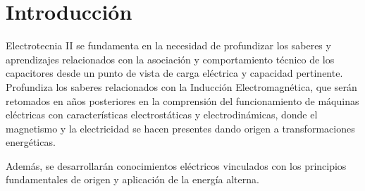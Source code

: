 \documentclass[../main]{subfiles}
\begin{document}
\chapter*{Introducción}
Electrotecnia II se fundamenta en la necesidad de profundizar 
los saberes y aprendizajes relacionados con la asociación y comportamiento técnico de los capacitores desde un punto de vista de carga eléctrica y capacidad pertinente. 
Profundiza los saberes relacionados con la Inducción Electromagnética, que serán retomados en años posteriores en la comprensión del funcionamiento de máquinas eléctricas con características electrostáticas y electrodinámicas, donde el magnetismo y la electricidad se hacen presentes dando origen a transformaciones energéticas. 

Además, se desarrollarán conocimientos eléctricos vinculados con los principios fundamentales de origen y aplicación de la energía alterna. 
\end{document}
